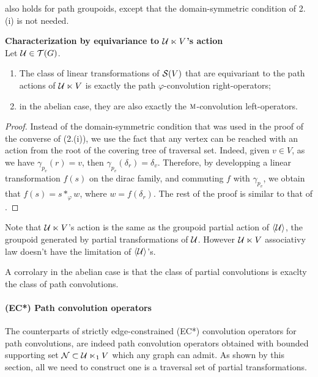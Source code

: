 also holds for path groupoids, except that the domain-symmetric condition of 2.(i) is not needed.

\begin{proposition}\textbf{Characterization by equivariance to $\mathcal{U} \ltimes V$'s action}\\
Let $\mathcal{U} \in \operatorname{\mathcal{T}}(G)$.
\begin{enumerate}[label=(\roman*)]
\item The class of linear transformations of $\mathcal{S}(V)$ that are equivariant to the path actions of $\mathcal{U} \ltimes V$ is exactly the path $\varphi$-convolution right-operators;
\item in the abelian case, they are also exactly the $\operatorname{\textsc{m}}$-convolution left-operators.
\end{enumerate}
\end{proposition}

\begin{proof}
Instead of the domain-symmetric condition that was used in the proof of the converse of  (2.(i)), we use the fact that any vertex can be reached with an action from the root of the covering tree of traversal set. Indeed, given $v \in V$, as we have $\gamma_{p_v}(r)=v$, then $\gamma_{p_v}(\delta_r) = \delta_v$. Therefore, by developping a linear transformation $f(s)$ on the dirac family, and commuting $f$ with $\gamma_{p_v}$, we obtain that $f(s) = s \ast_\varphi w$, where $w = f(\delta_r)$. The rest of the proof is similar to that of .
\end{proof}

\begin{remark}
Note that $\mathcal{U} \ltimes V$'s action is the same as the groupoid partial action of $\langle \mathcal{U} \rangle$, the groupoid generated by partial transformations of $\mathcal{U}$. However $\mathcal{U} \ltimes V$ associativy law doesn't have the limitation of $\langle \mathcal{U} \rangle$'s.
\end{remark}

\begin{remark}
A corrolary in the abelian case is that the class of partial convolutions is exaclty the class of path convolutions.
\end{remark}

\paragraph{(EC*) Path convolution operators}
The counterparts of strictly edge-constrained (EC*) convolution operators for path convolutions, are indeed path convolution operators obtained with bounded supporting set $\mathcal{N} \subset \mathcal{U} \ltimes_1 V$ which any graph can admit. As shown by this section, all we need to construct one is a traversal set of partial transformations.
